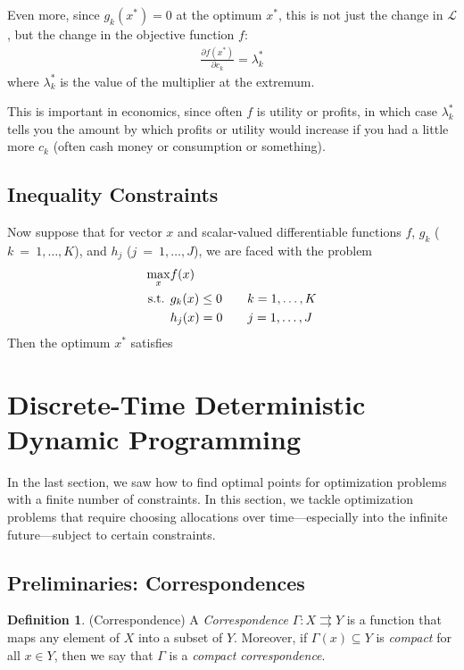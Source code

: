 \documentclass[12pt]{article}
\numberwithin{equation}{section} %
\theoremstyle{plain}
\theoremstyle{definition}
\newtheorem{defn}[thm]{Definition}
\theoremstyle{remark}
\begin{document}
Even more, since $g_k(x^*)=0$ at the optimum $x^*$, this is not just the
change in $\mathscr{L}$, but the change in the objective function $f$:
\begin{align*}
  \frac{\partial f(x^*)}{\partial c_k} = \lambda^*_k
\end{align*}
where $\lambda^*_k$ is the value of the multiplier at the extremum.

This is important in economics, since often $f$ is utility or profits,
in which case $\lambda^*_k$ tells you the amount by which profits or
utility would increase if you had a little more $c_k$ (often cash money
or consumption or something).

\subsection{Inequality Constraints}

Now suppose that for vector $x$ and scalar-valued differentiable
functions $f$, $g_k$ ($k~=~1,\ldots,K$), and $h_j$ ($j~=~1,\ldots,J$),
we are faced with the problem
\begin{align}
  \max_x &f(x) \label{prob:ineqconst}\\
  \text{s.t. } &g_k(x) \leq 0 \qquad k=1,\ldots,K\notag\\
               &h_j(x) =0 \qquad j=1,\ldots,J\notag
\end{align}
Then the optimum $x^*$ satisfies

\clearpage
\section{Discrete-Time Deterministic Dynamic Programming}
\label{sec:discrete-dynamic}

In the last section, we saw how to find optimal points for optimization
problems with a finite number of constraints. In this section, we tackle
optimization problems that require choosing allocations over
time---especially into the infinite future---subject to certain
constraints.

\subsection{Preliminaries: Correspondences}

\begin{defn}{(Correspondence)}
A \emph{Correspondence} $\Gamma:X\rightrightarrows Y$ is a function that
maps any element of $X$ into a subset of $Y$. Moreover, if
$\Gamma(x)\subseteq Y$ is \emph{compact} for all $x\in Y$, then we say
that $\Gamma$ is a \emph{compact correspondence}.
\end{defn}
\end{document}
